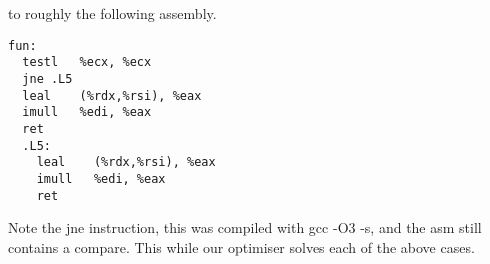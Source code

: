 to roughly the following assembly. 
\begin{verbatim}
fun:                                                                                 
  testl   %ecx, %ecx                                                               
  jne .L5                                                                          
  leal    (%rdx,%rsi), %eax                                                        
  imull   %edi, %eax                                                               
  ret                                                                              
  .L5:                                                                                 
    leal    (%rdx,%rsi), %eax                                                        
    imull   %edi, %eax                                                               
    ret                                                                              
\end{verbatim}
Note the jne instruction, this was
compiled with gcc -O3 -s, and the asm still contains a compare.
This while our optimiser solves each of the above cases.



